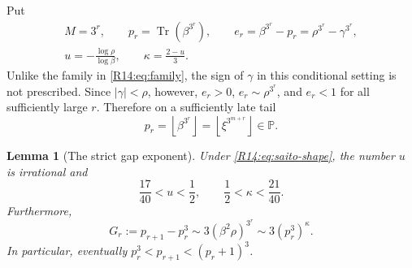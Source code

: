 \documentclass[11pt,a4paper]{article}
\newtheorem{lemma}[theorem]{Lemma}\newtheorem{proposition}[theorem]{Proposition}
\theoremstyle{definition}\newtheorem{definition}[theorem]{Definition}
\theoremstyle{remark}\newtheorem{remark}[theorem]{Remark}
\newcommand{\PP}{\mathbb P}\newcommand{\W}{\mathcal W}\newcommand{\SaitoL}{\mathcal S}
\newcommand{\floor}[1]{\left\lfloor#1\right\rfloor}
\DeclareMathOperator{\Tr}{Tr}\DeclareMathOperator{\tr}{tr}\DeclareMathOperator{\Nm}{N}
\begin{document}
Put
\begin{equation}\label{R14:eq:pisot-notation}
 \begin{gathered}
 M=3^r,\qquad p_r=\Tr(\beta^{3^r}),\qquad
 e_r=\beta^{3^r}-p_r=\rho^{3^r}-\gamma^{3^r},\\
 u=-\frac{\log\rho}{\log\beta},\qquad
 \kappa=\frac{2-u}{3}.
 \end{gathered}
\end{equation}
Unlike the family in \eqref{R14:eq:family}, the sign of $\gamma$ in
this conditional setting is not prescribed. Since
$|\gamma|<\rho$, however, $e_r>0$, $e_r\sim\rho^{3^r}$, and
$e_r<1$ for all sufficiently large $r$. Therefore on a sufficiently
late tail
\begin{equation}\label{R14:eq:prime-tail}
 p_r=\floor{\beta^{3^r}}=\floor{\xi^{3^{m+r}}}\in\PP.
\end{equation}

\begin{lemma}[The strict gap exponent]\label{R14:lem:strict-gap}
Under \eqref{R14:eq:saito-shape}, the number $u$ is irrational and
\begin{equation}\label{R14:eq:u-range}
 \frac{17}{40}<u<\frac12,\qquad
 \frac12<\kappa<\frac{21}{40}.
\end{equation}
Furthermore,
\begin{equation}\label{R14:eq:gap-asymptotic}
 G_r:=p_{r+1}-p_r^3
 \sim3(\beta^2\rho)^{3^r}
 \sim3(p_r^3)^\kappa.
\end{equation}
In particular, eventually
$p_r^3<p_{r+1}<(p_r+1)^3$.
\end{lemma}
\end{document}
